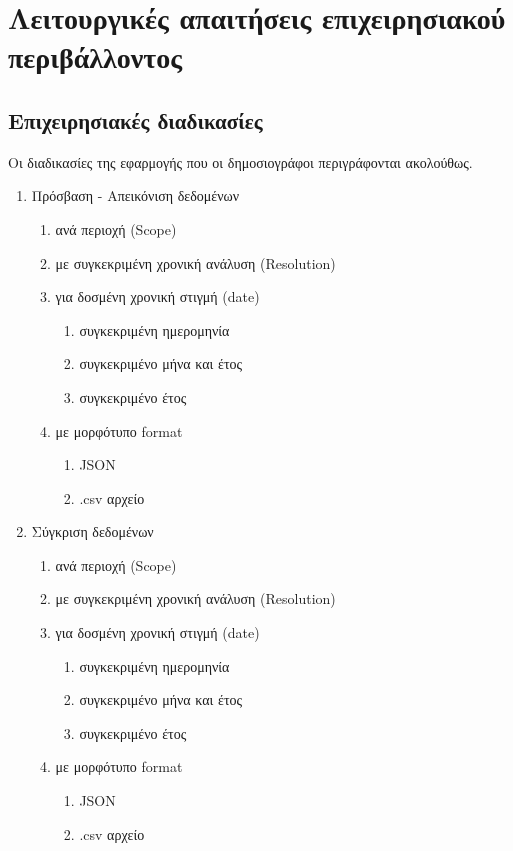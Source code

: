 \documentclass[a4paper,12pt, oneside]{article}
\begin{document}
\section{Λειτουργικές απαιτήσεις επιχειρησιακού περιβάλλοντος}
\subsection{Επιχειρησιακές διαδικασίες}
Οι διαδικασίες της εφαρμογής που οι δημοσιογράφοι περιγράφονται ακολούθως.
\renewcommand{\theenumi}{\Roman{enumi}}
\renewcommand{\theenumii}{\arabic{enumii}}
\renewcommand{\theenumiii}{\alph{enumiii}}

\begin{enumerate}
   \item Πρόσβαση - Απεικόνιση δεδομένων
      \begin{enumerate}
     \item ανά περιοχή \textlatin{(Scope)}
     \item με συγκεκριμένη χρονική ανάλυση \textlatin{(Resolution)}
     \item για δοσμένη χρονική στιγμή \textlatin{(date)}
     \begin{enumerate}
  	\item συγκεκριμένη ημερομηνία
   	\item συγκεκριμένο μήνα και έτος	   	
	\item συγκεκριμένο έτος
     \end{enumerate}
     \item με μορφότυπο \textlatin{format}
     \begin{enumerate}
  	\item \textlatin{JSON}
   	\item \textlatin{.csv} αρχείο
     \end{enumerate}
   \end{enumerate}
   \item Σύγκριση δεδομένων
       \begin{enumerate}
     \item ανά περιοχή \textlatin{(Scope)}
     \item με συγκεκριμένη χρονική ανάλυση \textlatin{(Resolution)}
     \item για δοσμένη χρονική στιγμή \textlatin{(date)}
     \begin{enumerate}
  	\item συγκεκριμένη ημερομηνία
   	\item συγκεκριμένο μήνα και έτος	   	
	\item συγκεκριμένο έτος
     \end{enumerate}
     \item με μορφότυπο \textlatin{format}
     \begin{enumerate}
  	\item \textlatin{JSON}
   	\item \textlatin{.csv} αρχείο
     \end{enumerate}
   \end{enumerate}


\end{enumerate}
\end{document}
